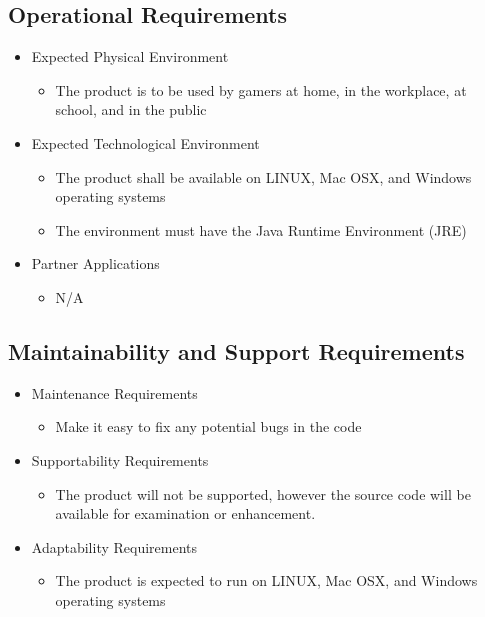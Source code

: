\documentclass[12pt]{article}
\begin{document}
\subsection{Operational Requirements}
\begin{itemize}
    \item Expected Physical Environment
    \begin{itemize}
        \item The product is to be used by gamers at home, in the workplace, at school, and in the public
    \end{itemize}
    \item Expected Technological Environment
    \begin{itemize}
        \item The product shall be available on LINUX, Mac OSX, and Windows operating systems
        \item The environment must have the Java Runtime Environment (JRE)
    \end{itemize}
    \item Partner Applications
    \begin{itemize}
        \item N/A
    \end{itemize}
\end{itemize}

\subsection{Maintainability and Support Requirements}
    \begin{itemize}
        \item Maintenance Requirements
    \begin{itemize}
        \item Make it easy to fix any potential bugs in the code
    \end{itemize}
    \item Supportability Requirements
    \begin{itemize}
        \item The product will not be supported, however the source code will be available for examination or enhancement.
    \end{itemize}
    \item Adaptability Requirements
    \begin{itemize}
        \item The product is expected to run on LINUX, Mac OSX, and Windows operating systems
    \end{itemize}
\end{itemize}
\end{document}
